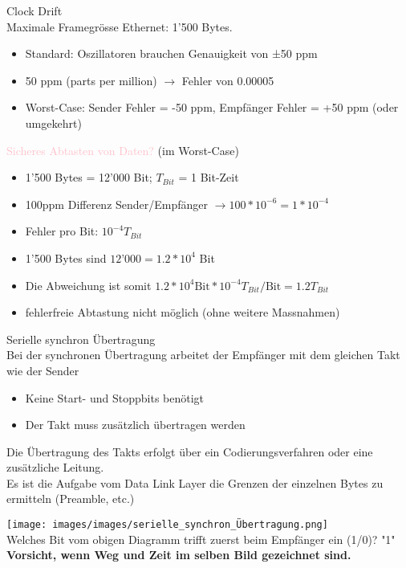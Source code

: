 \begin{KR}{Clock Drift}\\
    Maximale Framegrösse Ethernet: 1’500 Bytes.
    \begin{itemize}
        \item Standard: Oszillatoren brauchen Genauigkeit von ±50 ppm 
        \item 50 ppm (parts per million) $\rightarrow$ Fehler von 0.00005
        \item Worst-Case: Sender Fehler = -50 ppm, Empfänger Fehler = +50 ppm (oder umgekehrt)
    \end{itemize}
    \textcolor{pink}{Sicheres Abtasten von Daten?} (im Worst-Case)
    \begin{itemize}
        \item 1'500 Bytes = 12'000 Bit; $T_{Bit}$ = 1 Bit-Zeit
        \item 100ppm Differenz Sender/Empfänger $\rightarrow 100 * 10^{-6} = 1 * 10^{-4}$
        \item Fehler pro Bit: $10^{-4} T_{Bit}$
        \item 1’500 Bytes sind $12’000 = 1.2 * 10^4$ Bit
        \item Die Abweichung ist somit $1.2 * 10^4 \text{Bit} * 10^{-4} T_{Bit} / \text{Bit} = 1.2 T_{Bit}$
        \item fehlerfreie Abtastung nicht möglich (ohne weitere Massnahmen)
    \end{itemize}
\end{KR}

\columnbreak

\begin{definition}{Serielle synchron Übertragung}\\
    Bei der synchronen Übertragung arbeitet der Empfänger mit dem gleichen Takt wie der Sender
    \begin{itemize}
        \item Keine Start- und Stoppbits benötigt
        \item Der Takt muss zusätzlich übertragen werden
    \end{itemize}
    Die Übertragung des Takts erfolgt über ein Codierungsverfahren oder eine zusätzliche Leitung. \\
    Es ist die Aufgabe vom Data Link Layer die Grenzen der einzelnen Bytes zu ermitteln (Preamble, etc.)
\end{definition}

\begin{example}
    \texttt{[image: images/images/serielle\_synchron\_Übertragung.png]}\\
    Welches Bit vom obigen Diagramm trifft zuerst beim Empfänger ein (1/0)? "1"\\
    \textbf{Vorsicht, wenn Weg und Zeit im selben Bild gezeichnet sind.}
\end{example}

